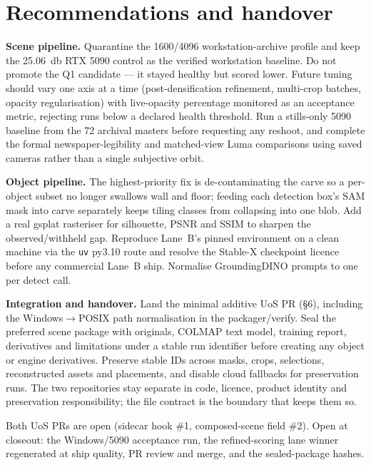 \section{Recommendations and handover}

\textbf{Scene pipeline.} Quarantine the 1600/4096 workstation-archive profile and keep the
\SI{25.06}{\decibel} RTX 5090 control as the verified workstation baseline. Do not promote the Q1
candidate --- it stayed healthy but scored lower. Future tuning should vary one axis at a time
(post-densification refinement, multi-crop batches, opacity regularisation) with live-opacity
percentage monitored as an acceptance metric, rejecting runs below a declared health threshold. Run a
stills-only 5090 baseline from the 72 archival masters before requesting any reshoot, and complete the
formal newspaper-legibility and matched-view Luma comparisons using saved cameras rather than a single
subjective orbit.

\textbf{Object pipeline.} The highest-priority fix is de-contaminating the carve so a per-object subset
no longer swallows wall and floor; feeding each detection box's SAM mask into carve separately keeps
tiling classes from collapsing into one blob. Add a real gsplat
rasteriser for silhouette, PSNR and SSIM to sharpen the observed/withheld gap. Reproduce Lane~B's pinned environment on a clean machine via the \texttt{uv} py3.10 route and resolve
the Stable-X checkpoint licence before any commercial Lane~B ship. Normalise GroundingDINO prompts to
one per detect call.

\textbf{Integration and handover.} Land the minimal additive UoS PR (\S6), including the
Windows$\rightarrow$POSIX path normalisation in the packager/verify. Seal the preferred scene package
with originals, COLMAP text model, training report, derivatives and limitations under a stable run
identifier before creating any object or engine derivatives. Preserve stable IDs across masks, crops,
selections, reconstructed assets and placements, and disable cloud fallbacks for preservation runs.
The two repositories stay separate in code, licence, product identity and preservation responsibility;
the file contract is the boundary that keeps them so.

Both UoS PRs are open (sidecar hook \#1, composed-scene field \#2). Open at closeout: the Windows/5090
acceptance run, the refined-scoring lane winner regenerated at ship quality, PR review and merge, and
the sealed-package hashes.
